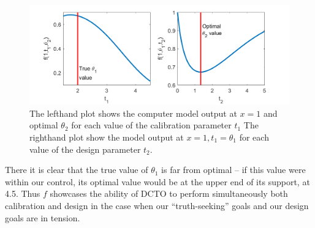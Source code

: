 \documentclass[12pt]{article}
\begin{document}
\begin{figure}
\centering
\includegraphics[scale=0.85]{FIG_true_optimal_theta1_theta2}
\captionsetup{width=.85\linewidth}
\caption{The lefthand plot shows the computer model output at $x=1$ and optimal $\theta_2$ for each value of the calibration parameter $t_1$ The righthand plot show the model output at $x=1,t_1=\theta_1$ for each value of the design parameter $t_2$.}
\label{fig:true_vals}
\end{figure}
%
There it is clear that the true value of $\theta_1$ is far from optimal -- if this value were within our control, its optimal value would be at the upper end of its support, at 4.5.
%
Thus $f$ showcases the ability of DCTO to perform simultaneously both calibration and design in the case when our ``truth-seeking'' goals and our design goals are in tension.
%

%
\end{document}
